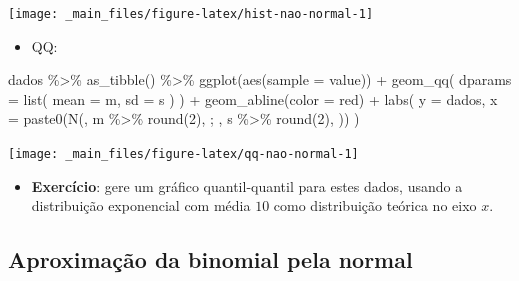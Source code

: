 \documentclass[
  11pt]{report}
\newenvironment{Shaded}{\begin{snugshade}}{\end{snugshade}}
\newcommand{\AttributeTok}[1]{\textcolor[rgb]{0.77,0.63,0.00}{#1}}
\newcommand{\DecValTok}[1]{\textcolor[rgb]{0.00,0.00,0.81}{#1}}
\newcommand{\FunctionTok}[1]{\textcolor[rgb]{0.00,0.00,0.00}{#1}}
\newcommand{\NormalTok}[1]{#1}
\newcommand{\SpecialCharTok}[1]{\textcolor[rgb]{0.00,0.00,0.00}{#1}}
\newcommand{\StringTok}[1]{\textcolor[rgb]{0.31,0.60,0.02}{#1}}
\providecommand{\tightlist}{%
  \setlength{\itemsep}{0pt}\setlength{\parskip}{0pt}}
\renewenvironment{Shaded}{
    \begin{mdframed}[%
      roundcorner=2pt,%
      innerleftmargin=5pt,%
      innerrightmargin=5pt,%
      topline=true,%
      leftline=true,%
      rightline=true,%
      bottomline=true,%
      linewidth=0.5pt,%
      linecolor=black!20,%
      backgroundcolor=black!2,%
      skipabove=2ex,%
      skipbelow=2.5ex%
    ]%
  }
  {
    \end{mdframed}
  }
\begin{document}
\begin{center}\texttt{[image: \_main\_files/figure-latex/hist-nao-normal-1]} \end{center}

\begin{itemize}
\tightlist
\item
  QQ:
\end{itemize}

\begin{Shaded}
\begin{Highlighting}[]
\NormalTok{dados }\SpecialCharTok{\%\textgreater{}\%} 
  \FunctionTok{as\_tibble}\NormalTok{() }\SpecialCharTok{\%\textgreater{}\%} 
  \FunctionTok{ggplot}\NormalTok{(}\FunctionTok{aes}\NormalTok{(}\AttributeTok{sample =}\NormalTok{ value)) }\SpecialCharTok{+}
    \FunctionTok{geom\_qq}\NormalTok{(}
      \AttributeTok{dparams =} \FunctionTok{list}\NormalTok{(}
        \AttributeTok{mean =}\NormalTok{ m,}
        \AttributeTok{sd =}\NormalTok{ s}
\NormalTok{      )}
\NormalTok{    ) }\SpecialCharTok{+}
    \FunctionTok{geom\_abline}\NormalTok{(}\AttributeTok{color =} \StringTok{\textquotesingle{}red\textquotesingle{}}\NormalTok{) }\SpecialCharTok{+}
    \FunctionTok{labs}\NormalTok{(}
      \AttributeTok{y =} \StringTok{\textquotesingle{}dados\textquotesingle{}}\NormalTok{,}
      \AttributeTok{x =} \FunctionTok{paste0}\NormalTok{(}\StringTok{\textquotesingle{}N(\textquotesingle{}}\NormalTok{, m }\SpecialCharTok{\%\textgreater{}\%} \FunctionTok{round}\NormalTok{(}\DecValTok{2}\NormalTok{), }\StringTok{\textquotesingle{} ; \textquotesingle{}}\NormalTok{, s }\SpecialCharTok{\%\textgreater{}\%} \FunctionTok{round}\NormalTok{(}\DecValTok{2}\NormalTok{), }\StringTok{\textquotesingle{})\textquotesingle{}}\NormalTok{)}
\NormalTok{    )}
\end{Highlighting}
\end{Shaded}

\begin{center}\texttt{[image: \_main\_files/figure-latex/qq-nao-normal-1]} \end{center}

\begin{itemize}
\tightlist
\item
  \textbf{Exercício}: gere um gráfico quantil-quantil para estes dados, usando a distribuição exponencial com média $10$ como distribuição teórica no eixo $x$.
\end{itemize}

\hypertarget{aproximauxe7uxe3o-da-binomial-pela-normal}{%
\subsection{Aproximação da binomial pela normal}\label{aproximauxe7uxe3o-da-binomial-pela-normal}}
\end{document}
